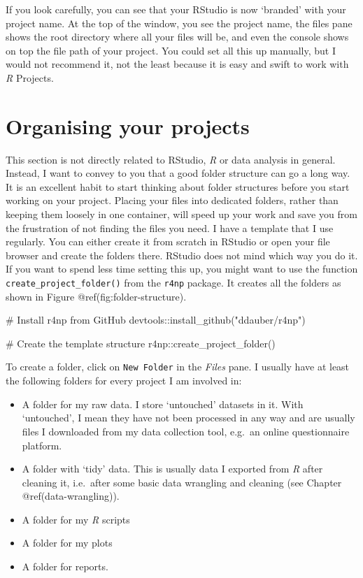 \documentclass[
  letterpaper,
]{krantz}
\makeatletter
\newenvironment{Shaded}{\begin{snugshade}}{\end{snugshade}}
\newcommand{\CommentTok}[1]{\textcolor[rgb]{0.37,0.37,0.37}{#1}}
\newcommand{\FunctionTok}[1]{\textcolor[rgb]{0.28,0.35,0.67}{#1}}
\newcommand{\NormalTok}[1]{\textcolor[rgb]{0.00,0.23,0.31}{#1}}
\newcommand{\SpecialCharTok}[1]{\textcolor[rgb]{0.37,0.37,0.37}{#1}}
\newcommand{\StringTok}[1]{\textcolor[rgb]{0.13,0.47,0.30}{#1}}
\newenvironment{kframe}{%
\medskip{}
\setlength{\fboxsep}{.8em}
 \def\at@end@of@kframe{}%
 \ifinner\ifhmode%
  \def\at@end@of@kframe{\end{minipage}}%
  \begin{minipage}{\columnwidth}%
 \fi\fi%
 \def\FrameCommand##1{\hskip\@totalleftmargin \hskip-\fboxsep
 \colorbox{shadecolor}{##1}\hskip-\fboxsep
     \hskip-\linewidth \hskip-\@totalleftmargin \hskip\columnwidth}%
 \MakeFramed {\advance\hsize-\width
   \@totalleftmargin\z@ \linewidth\hsize
   \@setminipage}}%
 {\par\unskip\endMakeFramed%
 \at@end@of@kframe}
\renewenvironment{Shaded}{\begin{kframe}}{\end{kframe}}
\makeatother
\begin{document}
If you look carefully, you can see that your RStudio is now `branded'
with your project name. At the top of the window, you see the project
name, the files pane shows the root directory where all your files will
be, and even the console shows on top the file path of your project. You
could set all this up manually, but I would not recommend it, not the
least because it is easy and swift to work with \emph{R} Projects.

\section{Organising your projects}\label{organising-your-projects}

This section is not directly related to RStudio, \emph{R} or data
analysis in general. Instead, I want to convey to you that a good folder
structure can go a long way. It is an excellent habit to start thinking
about folder structures before you start working on your project.
Placing your files into dedicated folders, rather than keeping them
loosely in one container, will speed up your work and save you from the
frustration of not finding the files you need. I have a template that I
use regularly. You can either create it from scratch in RStudio or open
your file browser and create the folders there. RStudio does not mind
which way you do it. If you want to spend less time setting this up, you
might want to use the function \texttt{create\_project\_folder()} from
the \texttt{r4np} package. It creates all the folders as shown in Figure
@ref(fig:folder-structure).

\begin{Shaded}
\begin{Highlighting}[]
\CommentTok{\# Install \textquotesingle{}r4np\textquotesingle{} from GitHub}
\NormalTok{devtools}\SpecialCharTok{::}\FunctionTok{install\_github}\NormalTok{(}\StringTok{"ddauber/r4np"}\NormalTok{)}

\CommentTok{\# Create the template structure}
\NormalTok{r4np}\SpecialCharTok{::}\FunctionTok{create\_project\_folder}\NormalTok{()}
\end{Highlighting}
\end{Shaded}

To create a folder, click on \texttt{New\ Folder} in the \emph{Files}
pane. I usually have at least the following folders for every project I
am involved in:

\begin{itemize}
\item
  A folder for my raw data. I store `untouched' datasets in it. With
  `untouched', I mean they have not been processed in any way and are
  usually files I downloaded from my data collection tool, e.g.~an
  online questionnaire platform.
\item
  A folder with `tidy' data. This is usually data I exported from
  \emph{R} after cleaning it, i.e.~after some basic data wrangling and
  cleaning (see Chapter @ref(data-wrangling)).
\item
  A folder for my \emph{R} scripts
\item
  A folder for my plots
\item
  A folder for reports.
\end{itemize}
\end{document}

